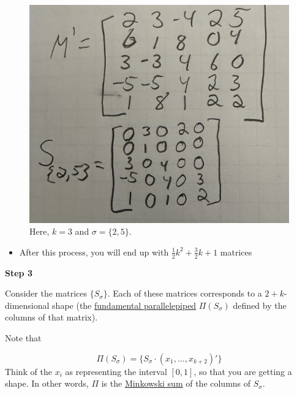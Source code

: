 \documentclass[
  letterpaper,
  DIV=11,
  numbers=noendperiod]{scrreprt}
\providecommand{\tightlist}{%
  \setlength{\itemsep}{0pt}\setlength{\parskip}{0pt}}\usepackage{longtable,booktabs,array}
\begin{document}
\begin{figure}

{\centering \includegraphics{images/matrix_example.png}

}

\caption{Here, \(k = 3\) and \(\sigma = \{2, 5\}\).}

\end{figure}

\begin{itemize}
\tightlist
\item
  After this process, you will end up with
  \(\frac{1}{2}k^2 + \frac{3}{2}k + 1\) matrices
\end{itemize}

\textbf{Step 3}

Consider the matrices \(\{S_\sigma\}\). Each of these matrices
corresponds to a \(2+k\)-dimensional shape (the
\href{https://en.wikipedia.org/wiki/Parallelepiped\#:~:text=In\%20geometry\%2C\%20a\%20parallelepiped\%20is,cube\%20relates\%20to\%20a\%20square.}{fundamental
parallelepiped} \(\Pi \left ( S_\sigma\right )\) defined by the columns
of that matrix).

\begin{tcolorbox}[enhanced jigsaw, titlerule=0mm, arc=.35mm, coltitle=black, left=2mm, colframe=quarto-callout-note-color-frame, opacitybacktitle=0.6, bottomrule=.15mm, rightrule=.15mm, breakable, leftrule=.75mm, title=\textcolor{quarto-callout-note-color}{\faInfo}\hspace{0.5em}{The fundamental parallelepiped \(\Pi(S_\sigma)\)}, bottomtitle=1mm, toptitle=1mm, toprule=.15mm, colback=white, opacityback=0, colbacktitle=quarto-callout-note-color!10!white]

Note that

\[\Pi \left ( S_\sigma\right ) = \{S_\sigma \cdot (x_1, \dots, x_{k+2})'\}\]
Think of the \(x_i\) as representing the interval \([0,1]\), so that you
are getting a shape. In other words, \(\Pi\) is the
\href{https://en.wikipedia.org/wiki/Minkowski_addition}{Minkowski sum}
of the columns of \(S_\sigma\).

\end{tcolorbox}
\end{document}

